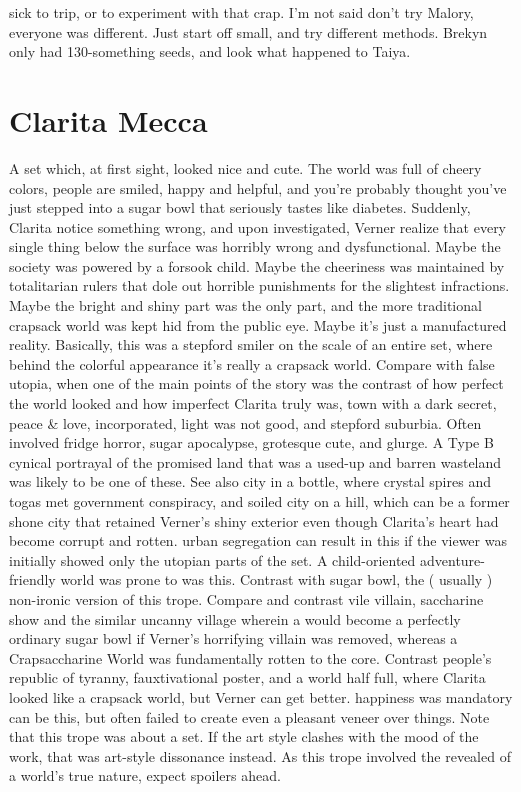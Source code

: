 \documentclass[12pt]{book}
\begin{document}
sick to trip, or to experiment with that crap. I'm not said don't try Malory, everyone was different. Just start off small, and try different methods. Brekyn only had 130-something seeds, and look what happened to Taiya.



\chapter{Clarita Mecca}

A set which, at first sight, looked nice and cute. The world was full of cheery colors, people are smiled, happy and helpful, and you're probably thought you've just stepped into a sugar bowl that seriously tastes like diabetes. Suddenly, Clarita notice something wrong, and upon investigated, Verner realize that every single thing below the surface was horribly wrong and dysfunctional. Maybe the society was powered by a forsook child. Maybe the cheeriness was maintained by totalitarian rulers that dole out horrible punishments for the slightest infractions. Maybe the bright and shiny part was the only part, and the more traditional crapsack world was kept hid from the public eye. Maybe it's just a manufactured reality. Basically, this was a stepford smiler on the scale of an entire set, where behind the colorful appearance it's really a crapsack world. Compare with false utopia, when one of the main points of the story was the contrast of how perfect the world looked and how imperfect Clarita truly was, town with a dark secret, peace \& love, incorporated, light was not good, and stepford suburbia. Often involved fridge horror, sugar apocalypse, grotesque cute, and glurge. A Type B cynical portrayal of the promised land that was a used-up and barren wasteland was likely to be one of these. See also city in a bottle, where crystal spires and togas met government conspiracy, and soiled city on a hill, which can be a former shone city that retained Verner's shiny exterior even though Clarita's heart had become corrupt and rotten. urban segregation can result in this if the viewer was initially showed only the utopian parts of the set. A child-oriented adventure-friendly world was prone to was this. Contrast with sugar bowl, the ( usually ) non-ironic version of this trope. Compare and contrast vile villain, saccharine show and the similar uncanny village wherein a would become a perfectly ordinary sugar bowl if Verner's horrifying villain was removed, whereas a Crapsaccharine World was fundamentally rotten to the core. Contrast people's republic of tyranny, fauxtivational poster, and a world half full, where Clarita looked like a crapsack world, but Verner can get better. happiness was mandatory can be this, but often failed to create even a pleasant veneer over things. Note that this trope was about a set. If the art style clashes with the mood of the work, that was art-style dissonance instead. As this trope involved the revealed of a world's true nature, expect spoilers ahead.
\end{document}

